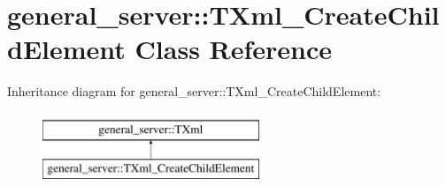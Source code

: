 \hypertarget{classgeneral__server_1_1TXml__CreateChildElement}{\section{general\-\_\-server\-:\-:\-T\-Xml\-\_\-\-Create\-Child\-Element \-Class \-Reference}
\label{classgeneral__server_1_1TXml__CreateChildElement}
}
\-Inheritance diagram for general\-\_\-server\-:\-:\-T\-Xml\-\_\-\-Create\-Child\-Element\-:\begin{figure}[H]
\begin{center}
\leavevmode
\includegraphics[height=2.000000cm]{classgeneral__server_1_1TXml__CreateChildElement}
\end{center}
\end{figure}
